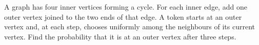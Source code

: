 A graph has four inner vertices forming a cycle. For each inner edge, add one outer vertex joined to the two ends of that edge. A token starts at an outer vertex and, at each step, chooses uniformly among the neighbours of its current vertex. Find the probability that it is at an outer vertex after three steps.
